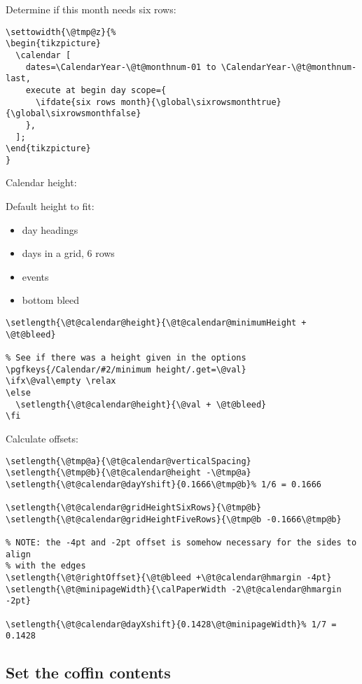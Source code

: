 \documentclass[11pt,oneside]{memoir-article}
\begin{document}
Determine if this month needs six rows:

\begin{verbatim}
\settowidth{\@tmp@z}{%
\begin{tikzpicture}
  \calendar [
    dates=\CalendarYear-\@t@monthnum-01 to \CalendarYear-\@t@monthnum-last,
    execute at begin day scope={
      \ifdate{six rows month}{\global\sixrowsmonthtrue}{\global\sixrowsmonthfalse}
    },
  ];
\end{tikzpicture}
}
\end{verbatim}

Calendar height:

Default height to fit:

\begin{itemize}
\item day headings
\item days in a grid, 6 rows
\item events
\item bottom bleed
\end{itemize}

\begin{verbatim}
\setlength{\@t@calendar@height}{\@t@calendar@minimumHeight + \@t@bleed}

% See if there was a height given in the options
\pgfkeys{/Calendar/#2/minimum height/.get=\@val}
\ifx\@val\empty \relax
\else
  \setlength{\@t@calendar@height}{\@val + \@t@bleed}
\fi
\end{verbatim}

Calculate offsets:

\begin{verbatim}
\setlength{\@tmp@a}{\@t@calendar@verticalSpacing}
\setlength{\@tmp@b}{\@t@calendar@height -\@tmp@a}
\setlength{\@t@calendar@dayYshift}{0.1666\@tmp@b}% 1/6 = 0.1666

\setlength{\@t@calendar@gridHeightSixRows}{\@tmp@b}
\setlength{\@t@calendar@gridHeightFiveRows}{\@tmp@b -0.1666\@tmp@b}

% NOTE: the -4pt and -2pt offset is somehow necessary for the sides to align
% with the edges
\setlength{\@t@rightOffset}{\@t@bleed +\@t@calendar@hmargin -4pt}
\setlength{\@t@minipageWidth}{\calPaperWidth -2\@t@calendar@hmargin -2pt}

\setlength{\@t@calendar@dayXshift}{0.1428\@t@minipageWidth}% 1/7 = 0.1428
\end{verbatim}

\subsection{Set the coffin contents}
\label{sec:org618c451}
\end{document}

